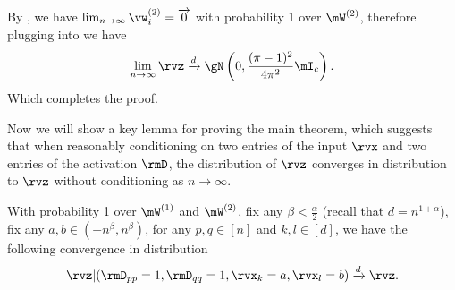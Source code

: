 \begin{proofof}{}
By , we have $\lim_{n\to\infty}\vw_i^{(2)} = \overrightarrow{0}$ with probability 1 over $\mW^{(2)}$, therefore plugging  into  we have\begin{equation}
    \lim_{n\to\infty} \rvz\xrightarrow{d}\gN\left(0,\frac{(\pi-1)^2}{4\pi^2}\mI_c\right).
\end{equation}
Which completes the proof.
\end{proofof}

Now we will show a key lemma for proving the main theorem, which suggests that when reasonably conditioning on two entries of the input $\rvx$ and two entries of the activation $\rmD$, the distribution of $\rvz$ converges in distribution to $\rvz$ without conditioning as $n\to\infty$.

\begin{lemma}
\label{lemma:z-invariant}
With probability 1 over $\mW^{(1)}$ and $\mW^{(2)}$, fix any $\beta < \frac\alpha2$ (recall that $d=n^{1+\alpha}$), fix any $a,b\in (-n^{\beta}, n^{\beta})$, for any $p,q\in[n]$ and $k,l\in[d]$, we have the following convergence in distribution\begin{equation}
    \rvz\vert(\rmD_{pp}=1, \rmD_{qq}=1, \rvx_k=a, \rvx_l=b)\xrightarrow{d} \rvz.
\end{equation}
\end{lemma}

